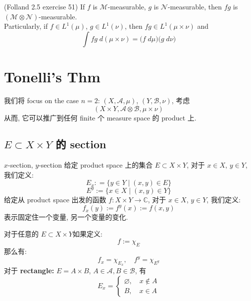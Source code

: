 \documentclass[lang=cn,11pt]{elegantbook}
\begin{document}
\begin{lemma}{(Folland 2.5 exercise 51)}
If $f$ is $\mathcal{M}$-measurable, $g$ is $\mathcal{N}$-measurable, then $fg$ is $(\mathcal{M}\otimes \mathcal{N})$-measurable.\\
Particularly, if $f \in L^1(\mu)$, $g \in L^1 (\nu)$, then $fg \in L^1(\mu \times \nu)$ and \[
\int fg \; d(\mu\times \nu) = \bigg(f \; d\mu \bigg) \bigg( g \; d\nu \bigg)
\]
\end{lemma}












\chapter{Tonelli's Thm}

 我们将 focus on the case $n=2$: $(X,\mathcal{A}, \mu)$, $(Y, \mathcal{B}, \nu)$, 考虑 \[
 (X \times Y, \mathcal{A} \otimes \mathcal{B}, \mu \times \nu)
 \]
 从而, 它可以推广到任何 finite 个 measure space 的 product 上.

\section{$E\subset X \times Y $ 的 section }
\begin{definition}{$x$-section, $y$-section}
给定 product space 上的集合 $E \subset X \times Y$, 对于 $x \in X$, $y\in Y$, 我们定义:
\[E_x : = \{  y\in Y \mid (x,y) \in E \}\]
\[
E^y := \{x\in X \mid (x,y) \in Y  \}
\]
给定从 product space 出发的函数 $f: X \times Y \to \mathbb{C}$, 对于 $x \in X$, $y\in Y$, 我们定义: \[
f_x (y) := f^y(x) := f(x,y)
\]
表示固定住一个变量, 另一个变量的变化.
\end{definition}

\begin{example}
对于任意的 $E \subset X \times Y$如果定义: \[
    f:= \chi_E
    \]
那么有: \[
f_x = \chi_{E_x},\quad f^y = \chi_{E^y}
\]
对于 \textbf{rectangle:} $E = A \times B $, $A \in \mathcal{A}, B \in \mathcal{B}$, 有 $$E_x = \begin{cases}
        \varnothing ,\quad x\not\in A \\
        B ,\quad x\in A
    \end{cases}$$
\end{example}
\end{document}
